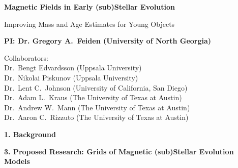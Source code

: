 \documentclass[12pt,letter]{article}
\begin{document}
\thispagestyle{empty}


\begin{center}
	{\bf {\Large Magnetic Fields in Early (sub)Stellar Evolution}
	
	{\large Improving Mass and Age Estimates for Young Objects}}
\end{center}

\begin{center}
	{\bf PI: Dr. Gregory A.~Feiden (University of North Georgia)} 
	
	Collaborators: \\
	Dr.~Bengt Edvardsson (Uppsala University) \\
	Dr.~Nikolai Piskunov (Uppsala University) \\
	Dr.~Lent C.~Johnson (University of California, San Diego) \\
	Dr.~Adam L.~Kraus (The University of Texas at Austin) \\
	Dr.~Andrew W.~Mann (The University of Texas at Austin) \\
	Dr.~Aaron C.~Rizzuto (The University of Texas at Austin) \\
\end{center}

\tableofcontents

\clearpage

{\bf\large 1. Background}  





\clearpage

{\bf\large 3. Proposed Research: Grids of Magnetic (sub)Stellar Evolution Models}  \\




\clearpage



\clearpage


\end{document}
